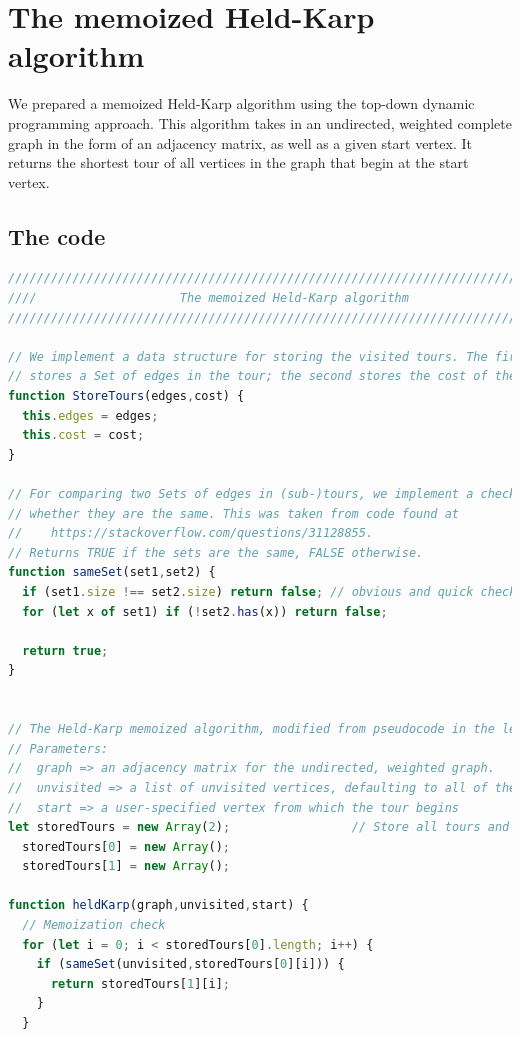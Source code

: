 \documentclass[10pt]{extarticle}
\begin{document}
\section{The memoized Held-Karp algorithm}
We prepared a memoized Held-Karp algorithm using the top-down dynamic
programming approach. This algorithm takes in an undirected, weighted complete
graph in the form of an adjacency matrix, as well as a given start vertex. It
returns the shortest tour of all vertices in the graph that begin at the start
vertex.

\subsection{The code}
\begin{lstlisting}[language=JavaScript]
///////////////////////////////////////////////////////////////////////////////
////                    The memoized Held-Karp algorithm                   ////
///////////////////////////////////////////////////////////////////////////////

// We implement a data structure for storing the visited tours. The first entry
// stores a Set of edges in the tour; the second stores the cost of the tour.
function StoreTours(edges,cost) {
  this.edges = edges;
  this.cost = cost;
}

// For comparing two Sets of edges in (sub-)tours, we implement a check to see
// whether they are the same. This was taken from code found at
//    https://stackoverflow.com/questions/31128855.
// Returns TRUE if the sets are the same, FALSE otherwise.
function sameSet(set1,set2) {
  if (set1.size !== set2.size) return false; // obvious and quick check
  for (let x of set1) if (!set2.has(x)) return false;

  return true;
}


// The Held-Karp memoized algorithm, modified from pseudocode in the lectures.
// Parameters:
//  graph => an adjacency matrix for the undirected, weighted graph.
//  unvisited => a list of unvisited vertices, defaulting to all of them
//  start => a user-specified vertex from which the tour begins
let storedTours = new Array(2);                 // Store all tours and sub-tours
  storedTours[0] = new Array();
  storedTours[1] = new Array();

function heldKarp(graph,unvisited,start) {
  // Memoization check
  for (let i = 0; i < storedTours[0].length; i++) {
    if (sameSet(unvisited,storedTours[0][i])) {
      return storedTours[1][i];
    }
  }


\end{lstlisting}
\end{document}
